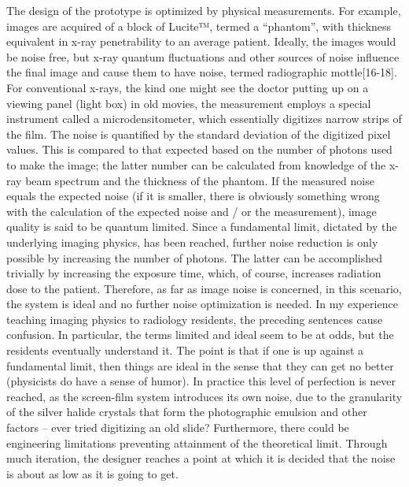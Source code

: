 \documentclass[
]{book}
\begin{document}
The design of the prototype is optimized by physical measurements. For example, images are acquired of a block of Lucite™, termed a ``phantom'', with thickness equivalent in x-ray penetrability to an average patient. Ideally, the images would be noise free, but x-ray quantum fluctuations and other sources of noise influence the final image and cause them to have noise, termed radiographic mottle{[}16-18{]}. For conventional x-rays, the kind one might see the doctor putting up on a viewing panel (light box) in old movies, the measurement employs a special instrument called a microdensitometer, which essentially digitizes narrow strips of the film. The noise is quantified by the standard deviation of the digitized pixel values. This is compared to that expected based on the number of photons used to make the image; the latter number can be calculated from knowledge of the x-ray beam spectrum and the thickness of the phantom. If the measured noise equals the expected noise (if it is smaller, there is obviously something wrong with the calculation of the expected noise and / or the measurement), image quality is said to be quantum limited. Since a fundamental limit, dictated by the underlying imaging physics, has been reached, further noise reduction is only possible by increasing the number of photons. The latter can be accomplished trivially by increasing the exposure time, which, of course, increases radiation dose to the patient. Therefore, as far as image noise is concerned, in this scenario, the system is ideal and no further noise optimization is needed. In my experience teaching imaging physics to radiology residents, the preceding sentences cause confusion. In particular, the terms limited and ideal seem to be at odds, but the residents eventually understand it. The point is that if one is up against a fundamental limit, then things are ideal in the sense that they can get no better (physicists do have a sense of humor). In practice this level of perfection is never reached, as the screen-film system introduces its own noise, due to the granularity of the silver halide crystals that form the photographic emulsion and other factors -- ever tried digitizing an old slide? Furthermore, there could be engineering limitations preventing attainment of the theoretical limit. Through much iteration, the designer reaches a point at which it is decided that the noise is about as low as it is going to get.
\end{document}
